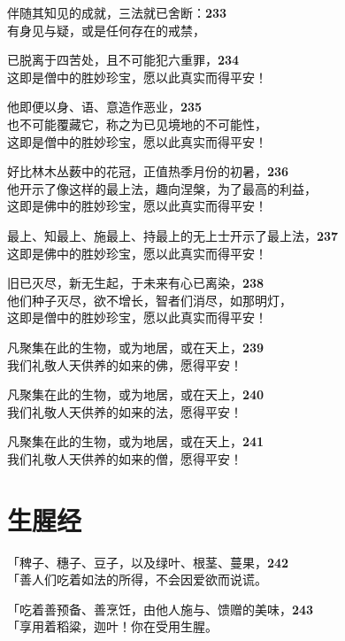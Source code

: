 伴随其知见的成就，三法就已舍断：\hfill{\grayfootnotesize \textbf{233}} \\
有身见与疑，或是任何存在的戒禁，


已脱离于四苦处，且不可能犯六重罪，\hfill{\grayfootnotesize \textbf{234}} \\
这即是僧中的胜妙珍宝，愿以此真实而得平安！


他即便以身、语、意造作恶业，\hfill{\grayfootnotesize \textbf{235}} \\
也不可能覆藏它，称之为已见境地的不可能性，\\
这即是僧中的胜妙珍宝，愿以此真实而得平安！


好比林木丛薮中的花冠，正值热季月份的初暑，\hfill{\grayfootnotesize \textbf{236}} \\
他开示了像这样的最上法，趣向涅槃，为了最高的利益，\\
这即是佛中的胜妙珍宝，愿以此真实而得平安！


最上、知最上、施最上、持最上的无上士开示了最上法，\hfill{\grayfootnotesize \textbf{237}} \\
这即是佛中的胜妙珍宝，愿以此真实而得平安！


旧已灭尽，新无生起，于未来有心已离染，\hfill{\grayfootnotesize \textbf{238}} \\
他们种子灭尽，欲不增长，智者们消尽，如那明灯，\\
这即是僧中的胜妙珍宝，愿以此真实而得平安！


凡聚集在此的生物，或为地居，或在天上，\hfill{\grayfootnotesize \textbf{239}} \\
我们礼敬人天供养的如来的佛，愿得平安！

凡聚集在此的生物，或为地居，或在天上，\hfill{\grayfootnotesize \textbf{240}} \\
我们礼敬人天供养的如来的法，愿得平安！

凡聚集在此的生物，或为地居，或在天上，\hfill{\grayfootnotesize \textbf{241}} \\
我们礼敬人天供养的如来的僧，愿得平安！


\section{生腥经}


「稗子、穗子、豆子，以及绿叶、根茎、蔓果，\hfill{\grayfootnotesize \textbf{242}} \\
「善人们吃着如法的所得，不会因爱欲而说谎。


「吃着善预备、善烹饪，由他人施与、馈赠的美味，\hfill{\grayfootnotesize \textbf{243}} \\
「享用着稻粱，迦叶！你在受用生腥。


